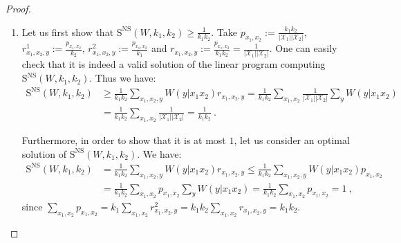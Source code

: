 \documentclass[11pt]{article}
\theoremstyle{definition}
\theoremstyle{remark}
\begin{document}
\begin{proof}
  \begin{enumerate}
  \item Let us first show that $\mathrm{S}^{\mathrm{NS}}(W,k_1,k_2) \geq \frac{1}{k_1k_2}$. Take $p_{x_1,x_2} := \frac{k_1k_2}{|\mathcal{X}_1||\mathcal{X}_2|}$, $r^1_{x_1,x_2,y} := \frac{p_{x_1,x_2}}{k_2}$, $r^2_{x_1,x_2,y} := \frac{p_{x_1,x_2}}{k_1}$ and $r_{x_1,x_2,y} := \frac{p_{x_1,x_2}}{k_1k_2} = \frac{1}{|\mathcal{X}_1||\mathcal{X}_2|}$. One can easily check that it is indeed a valid solution of the linear program computing $\mathrm{S}^{\mathrm{NS}}(W,k_1,k_2)$. Thus we have:
    \begin{equation}
      \begin{aligned}
        \mathrm{S}^{\mathrm{NS}}(W,k_1,k_2) &\geq \frac{1}{k_1k_2} \sum_{x_1,x_2,y} W(y|x_1x_2)r_{x_1,x_2,y} = \frac{1}{k_1k_2} \sum_{x_1,x_2} \frac{1}{|\mathcal{X}_1||\mathcal{X}_2|} \sum_y W(y|x_1x_2)\\
        &= \frac{1}{k_1k_2} \sum_{x_1,x_2} \frac{1}{|\mathcal{X}_1||\mathcal{X}_2|} = \frac{1}{k_1k_2} \ .
      \end{aligned}
    \end{equation}

    Furthermore, in order to show that it is at most $1$, let us consider an optimal solution of $\mathrm{S}^{\mathrm{NS}}(W,k_1,k_2)$. We have:
    \begin{equation}
      \begin{aligned}
        \mathrm{S}^{\mathrm{NS}}(W,k_1,k_2) &= \frac{1}{k_1k_2} \sum_{x_1,x_2,y} W(y|x_1x_2)r_{x_1,x_2,y} \leq \frac{1}{k_1k_2} \sum_{x_1,x_2,y} W(y|x_1x_2)p_{x_1,x_2}\\
        &= \frac{1}{k_1k_2} \sum_{x_1,x_2} p_{x_1,x_2} \sum_y W(y|x_1x_2) = \frac{1}{k_1k_2} \sum_{x_1,x_2} p_{x_1,x_2} = 1 \ ,
      \end{aligned}
    \end{equation}
    since $\sum_{x_1,x_2} p_{x_1,x_2} = k_1 \sum_{x_1,x_2} r^2_{x_1,x_2,y} = k_1k_2 \sum_{x_1,x_2} r_{x_1,x_2,y} =k_1k_2$.
    

\end{enumerate}
\end{proof}
\end{document}
